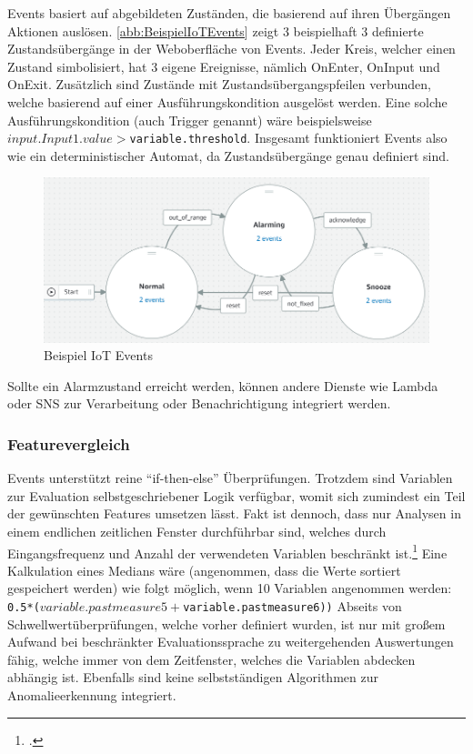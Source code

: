 \AWSIOT Events basiert auf abgebildeten Zuständen, die basierend auf ihren Übergängen Aktionen auslösen. \autoref{abb:BeispielIoTEvents} zeigt 3 beispielhaft 3 definierte Zustandsübergänge in der Weboberfläche von \AWSIOT Events. Jeder Kreis, welcher einen Zustand simbolisiert, hat 3 eigene Ereignisse, nämlich OnEnter, OnInput und OnExit. Zusätzlich sind Zustände mit Zustandsübergangspfeilen verbunden, welche basierend auf einer Ausführungskondition ausgelöst werden. Eine solche Ausführungskondition (auch Trigger genannt) wäre beispielsweise \texttt{$input.Input1.value > $variable.threshold}. Insgesamt funktioniert \AWSIOT{} Events also wie ein deterministischer Automat, da Zustandsübergänge genau definiert sind.
\begin{figure}[H]
\centering
\includegraphics[width=\textwidth]{graphics/IoT-Events-Demo.png}
\caption{Beispiel IoT Events}
\label{abb:BeispielIoTEvents}
\end{figure}
Sollte ein Alarmzustand erreicht werden, können andere Dienste wie Lambda oder \ac{SNS} zur Verarbeitung oder Benachrichtigung integriert werden.

\subsubsection{Featurevergleich}
\AWSIOT{} Events unterstützt reine \enquote{if-then-else} Überprüfungen. Trotzdem sind Variablen zur Evaluation selbstgeschriebener Logik verfügbar, womit sich zumindest ein Teil der gewünschten Features umsetzen lässt. Fakt ist dennoch, dass nur Analysen in einem endlichen zeitlichen Fenster durchführbar sind, welches durch Eingangsfrequenz und Anzahl der verwendeten Variablen beschränkt ist.\footcite[Vgl.][]{AmazonWebServicesInc..o.J.am} Eine Kalkulation eines Medians wäre (angenommen, dass die Werte sortiert gespeichert werden) wie folgt möglich, wenn 10 Variablen angenommen werden: \texttt{0.5*($variable.pastmeasure5 + $variable.pastmeasure6))}
Abseits von Schwellwertüberprüfungen, welche vorher definiert wurden, ist \AWSIOT{} nur mit großem Aufwand bei beschränkter Evaluationssprache zu weitergehenden Auswertungen fähig, welche immer von dem Zeitfenster, welches die Variablen abdecken abhängig ist. Ebenfalls sind keine selbstständigen Algorithmen zur Anomalieerkennung integriert.

